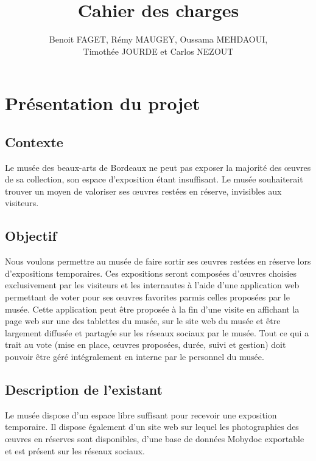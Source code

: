\documentclass[a4paper]{article}
\title{Cahier des charges}
\author{Benoit FAGET, Rémy MAUGEY, Oussama MEHDAOUI,\\Timothée JOURDE et Carlos NEZOUT}
\begin{document}
\maketitle

\tableofcontents
\newpage


\section{Présentation du projet}
\subsection{Contexte}
Le musée des beaux-arts de Bordeaux ne peut pas exposer la majorité des œuvres de sa collection, son espace d’exposition étant insuffisant. Le musée souhaiterait trouver un moyen de valoriser ses œuvres restées en réserve, invisibles aux visiteurs.
\subsection{Objectif}
Nous voulons permettre au musée de faire sortir ses œuvres restées en réserve lors d’expositions temporaires. Ces expositions seront composées d’œuvres choisies exclusivement par les visiteurs et les internautes à l’aide d’une application web permettant de voter pour ses œuvres favorites parmis celles proposées par le musée. Cette application peut être proposée à la fin d’une visite en affichant la page web sur une des tablettes du musée, sur le site web du musée et être largement diffusée et partagée sur les réseaux sociaux par le musée. Tout ce qui a trait au vote (mise en place, œuvres proposées, durée, suivi et gestion) doit pouvoir être géré intégralement en interne par le personnel du musée.
\subsection{Description de l'existant}
Le musée dispose d’un espace libre suffisant pour recevoir une exposition temporaire. Il dispose également d’un site web sur lequel les photographies des œuvres en réserves sont disponibles, d'une base de données Mobydoc exportable et est présent sur les réseaux sociaux.
\end{document}
